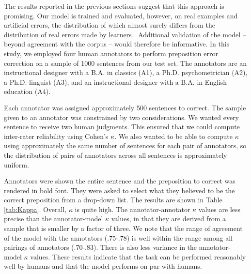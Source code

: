 The results reported in the previous sections suggest that this approach is promising.  Our model is trained and evaluated, however, on real examples and artificial errors, the distribution of which almost surely differs from the distribution of real errors made by learners  \cite{rozovskaya2010generating}.  Additional validation of the model -- beyond agreement with the corpus -- would therefore be informative.  In this study, we employed four human annotators to perform preposition error correction on a sample of 1000 sentences from our test set.  The annotators are an instructional designer with a B.A. in classics (A1), a Ph.D. psychometrician (A2), a Ph.D. linguist (A3), and an instructional designer with a B.A. in English education (A4).

Each annotator was assigned approximately 500 sentences to correct.  The sample given to an annotator was constrained by two considerations.  We wanted every sentence to receive two human judgments.  This ensured that we could compute inter-rater reliability using Cohen's $\kappa$.  We also wanted to be able to compute $\kappa$ using approximately the same number of sentences for each pair of annotators, so the distribution of pairs of annotators across all sentences is approximately uniform.

Annotators were shown the entire sentence and the preposition to correct was rendered in bold font.   They were asked to select what they believed to be the correct preposition from a drop-down list.  
The results are shown in Table \ref{tab:Kappa}.  Overall, $\kappa$ is quite high.  The annotator-annotator $\kappa$ values are less precise than the annotator-model $\kappa$ values, in that they are derived from a sample that is smaller by a factor of three.  We note that the range of agreement of the model with the annotators (.75-.78) is well within the range among all pairings of annotators (.70-.83).  There is also less variance in the annotator-model $\kappa$ values.  These results indicate that the task can be performed reasonably well by humans and that the model performs on par with humans.  

